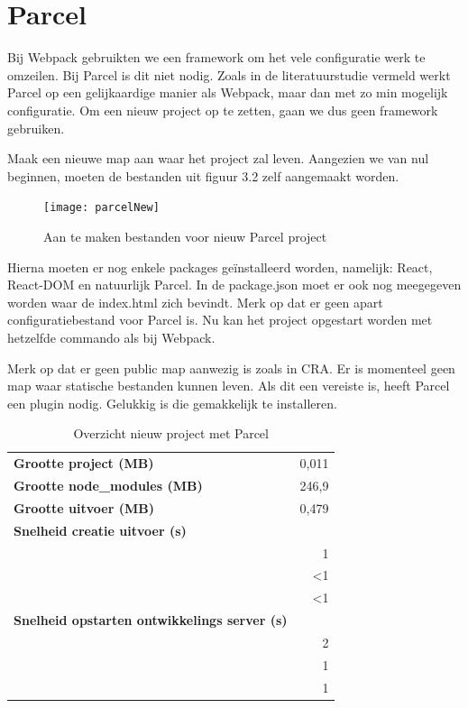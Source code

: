 \section{Parcel}
Bij Webpack gebruikten we een framework om het vele configuratie werk te omzeilen. Bij Parcel is dit niet nodig. Zoals in de literatuurstudie vermeld werkt Parcel op een gelijkaardige manier als Webpack, maar dan met zo min mogelijk configuratie. Om een nieuw project op te zetten, gaan we dus geen framework gebruiken.

Maak een nieuwe map aan waar het project zal leven. Aangezien we van nul beginnen, moeten de bestanden uit figuur 3.2 zelf aangemaakt worden.

\begin{figure}[h]
   \texttt{[image: parcelNew]}
       \centering
       \caption{Aan te maken bestanden voor nieuw Parcel project}
   \end{figure}

Hierna moeten er nog enkele packages geïnstalleerd worden, namelijk: React, React-DOM en natuurlijk Parcel. In de package.json moet er ook nog meegegeven worden waar de index.html zich bevindt. Merk op dat er geen apart configuratiebestand voor Parcel is. Nu kan het project opgestart worden met hetzelfde commando als bij Webpack.

 Merk op dat er geen public map aanwezig is zoals in CRA. Er is momenteel geen map waar statische bestanden kunnen leven. Als dit een vereiste is, heeft Parcel een plugin nodig. Gelukkig is die gemakkelijk te installeren.

\begin{table}[h]
   \centering
   \begin{tabular}{lr}
   \textbf{Grootte project (MB)} & 0,011 \\
   \textbf{Grootte node\_modules (MB)} & 246,9 \\
   \textbf{Grootte uitvoer (MB)} & 0,479 \\
   \textbf{Snelheid creatie uitvoer (s)} & \\
   \textbf{} & 1 \\
   \textbf{} & <1 \\
   \textbf{} & <1 \\
   \textbf{Snelheid opstarten ontwikkelings server (s)} &  \\
   \textbf{} & 2 \\
   \textbf{} & 1 \\
   \textbf{} & 1
   \end{tabular}
   \caption{Overzicht nieuw project met Parcel}
   \end{table}

